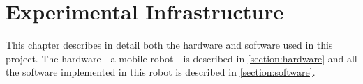 \chapter{Experimental Infrastructure}

This chapter describes in detail both the hardware and software used in this project. The hardware - a mobile robot - is described in \cref{section:hardware} and all the software implemented in this robot is described in \cref{section:software}.

% 

